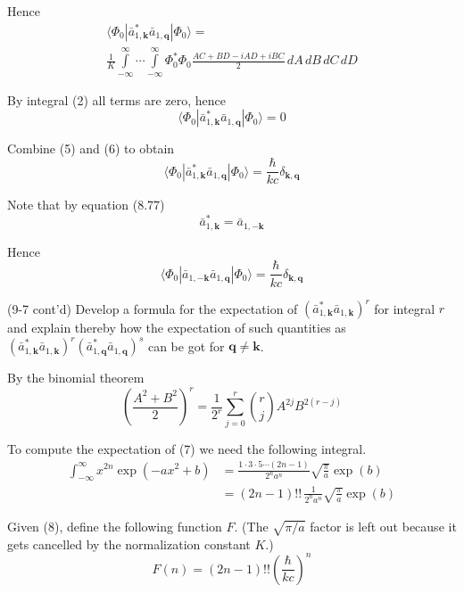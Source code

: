 \documentclass[12pt]{article}
\begin{document}
Hence
\begin{multline*}
\langle\Phi_0|\bar a_{1,\mathbf k}^*\bar a_{1,\mathbf q}|\Phi_0\rangle=
\\
\frac{1}{K}\int\limits_{-\infty}^\infty\cdots\int\limits_{-\infty}^\infty
\Phi_0^*\Phi_0
\frac{AC+BD-iAD+iBC}{2}
\,dA\,dB\,dC\,dD
\end{multline*}

By integral (2) all terms are zero, hence
\begin{equation*}
\langle\Phi_0|\bar a_{1,\mathbf k}^*\bar a_{1,\mathbf q}|\Phi_0\rangle=0
\tag{6}
\end{equation*}

Combine (5) and (6) to obtain
\begin{equation*}
\langle\Phi_0|\bar a_{1,\mathbf k}^*\bar a_{1,\mathbf q}|\Phi_0\rangle=\frac{\hbar}{kc}\delta_{\mathbf k,\mathbf q}
\end{equation*}

Note that by equation (8.77)
\begin{equation*}
\bar a_{1,\mathbf k}^*=\bar a_{1,-\mathbf k}
\end{equation*}

Hence
\begin{equation*}
\langle\Phi_0|\bar a_{1,-\mathbf k}\bar a_{1,\mathbf q}|\Phi_0\rangle=\frac{\hbar}{kc}\delta_{\mathbf k,\mathbf q}
\end{equation*}

(9-7 cont'd)
Develop a formula for the expectation of
$(\bar a_{1,\mathbf k}^*\bar a_{1,\mathbf k})^r$
for integral $r$ and explain thereby how the expectation of such
quantities as
$(\bar a_{1,\mathbf k}^*\bar a_{1,\mathbf k})^r
(\bar a_{1,\mathbf q}^*\bar a_{1,\mathbf q})^s$
can be got for $\mathbf q\ne\mathbf k$.

\bigskip
By the binomial theorem
\begin{equation*}
\left(\frac{A^2+B^2}{2}\right)^r=\frac{1}{2^r}\sum_{j=0}^r\binom{r}{j}A^{2j}B^{2(r-j)}
\tag{7}
\end{equation*}

To compute the expectation of (7) we need the following integral.
\begin{align*}
\int_{-\infty}^\infty x^{2n}\exp(-ax^2+b)
&=\frac{1\cdot3\cdot5\cdots(2n-1)}{2^na^n}\sqrt{\frac{\pi}{a}}\exp(b)
\\
&=(2n-1)!!\,\frac{1}{2^na^n}\sqrt{\frac{\pi}{a}}\exp(b)
\tag{8}
\end{align*}

Given (8), define the following function $F$.
(The $\sqrt{\pi/a}$ factor is left out because it gets cancelled by the normalization constant $K$.)
\begin{equation*}
F(n)=(2n-1)!!\left(\frac{\hbar}{kc}\right)^n
\end{equation*}
\end{document}

